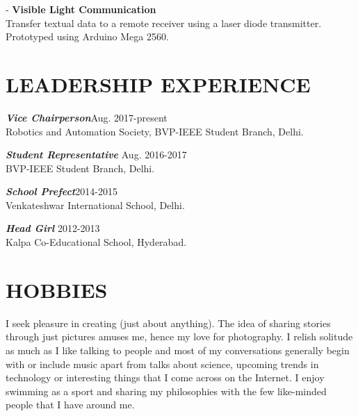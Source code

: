 \documentclass[margin, 10pt]{res} %
\begin{document}
\begin{resume}
- {\bf Visible Light Communication}\\
Transfer textual data to a remote receiver using a laser diode transmitter. Prototyped using Arduino Mega 2560. 


\section{LEADERSHIP EXPERIENCE}
{\sl {\bf Vice Chairperson}}\hfill Aug. 2017-present \\
Robotics and Automation Society, BVP-IEEE Student Branch, Delhi.

{\sl {\bf Student Representative}} \hfill Aug. 2016-2017\\ BVP-IEEE Student Branch, Delhi.

{\sl {\bf School Prefect}}\hfill 2014-2015\\
Venkateshwar International School, Delhi.

{\sl {\bf Head Girl}} \hfill 2012-2013\\ Kalpa Co-Educational School, Hyderabad.


\section{HOBBIES}
I seek pleasure in creating (just about anything). The idea of sharing stories through just pictures amuses me, hence my love for photography. I relish solitude as much as I like talking to people and most of my conversations generally begin with or include music apart from talks about science, upcoming trends in technology or interesting things that I come across on the Internet. I enjoy swimming as a sport and sharing my philosophies with the few like-minded people that I have around me.

\end{resume}
\end{document}
